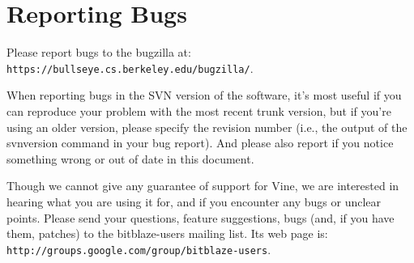 \documentclass[11pt,onecolumn]{article}
\let\url\nolinkurl %
\begin{document}
\section {Reporting Bugs}

\begin{svn}
Please report bugs to the bugzilla at:
\texttt{https://bullseye.cs.berkeley.edu/bugzilla/}.

When reporting bugs in the SVN version of the software, it's most
useful if you can reproduce your problem with the most recent trunk
version, but if you're using an older version, please specify the
revision number (i.e., the output of the svnversion command in your
bug report). And please also report if you notice something wrong or
out of date in this document.
\end{svn}
\begin{release}
Though we cannot give any guarantee of support for Vine, we are
interested in hearing what you are using it for, and if you encounter
any bugs or unclear points.
%
Please send your questions, feature suggestions, bugs (and, if you
have them, patches) to the bitblaze-users mailing list.
%
Its web page is:
\url{http://groups.google.com/group/bitblaze-users}.
\end{release}
\end{document}

